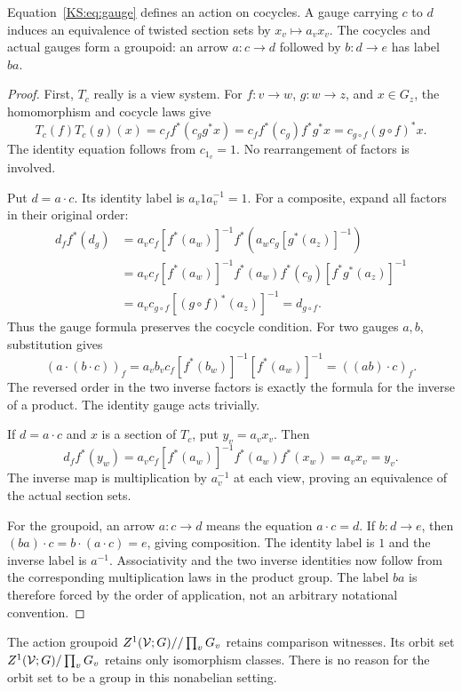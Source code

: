 \begin{KSproposition}\label{KS:KS30}
Equation~\eqref{KS:eq:gauge} defines an action on cocycles. A gauge carrying \(c\) to \(d\) induces an equivalence of twisted section sets by \(x_v\mapsto a_vx_v\). The cocycles and actual gauges form a groupoid: an arrow \(a:c\to d\) followed by \(b:d\to e\) has label \(ba\).
\end{KSproposition}
\begin{proof}
First, $T_c$ really is a view system. For $f:v\to w$, $g:w\to z$, and $x\in G_z$, the homomorphism and cocycle laws give
\[
 T_c(f)T_c(g)(x)=c_ff^*(c_gg^*x)
 =c_ff^*(c_g)f^*g^*x=c_{g\circ f}(g\circ f)^*x.
\]
The identity equation follows from $c_{1_v}=1$. No rearrangement of factors is involved.

Put $d=a\cdot c$. Its identity label is $a_v1a_v^{-1}=1$. For a composite, expand all factors in their original order:
\[
\begin{aligned}
 d_f f^*(d_g)
 &=a_vc_f[f^*(a_w)]^{-1}
   f^*(a_wc_g[g^*(a_z)]^{-1})\\
 &=a_vc_f[f^*(a_w)]^{-1}f^*(a_w)f^*(c_g)
       [f^*g^*(a_z)]^{-1}\\
 &=a_vc_{g\circ f}[(g\circ f)^*(a_z)]^{-1}
 =d_{g\circ f}.
\end{aligned}
\]
Thus the gauge formula preserves the cocycle condition. For two gauges $a,b$, substitution gives
\[
 (a\cdot(b\cdot c))_f
 =a_vb_vc_f[f^*(b_w)]^{-1}[f^*(a_w)]^{-1}
 =((ab)\cdot c)_f.
\]
The reversed order in the two inverse factors is exactly the formula for the inverse of a product. The identity gauge acts trivially.

If $d=a\cdot c$ and $x$ is a section of $T_c$, put $y_v=a_vx_v$. Then
\[
 d_ff^*(y_w)
 =a_vc_f[f^*(a_w)]^{-1}f^*(a_w)f^*(x_w)
 =a_vx_v=y_v.
\]
The inverse map is multiplication by $a_v^{-1}$ at each view, proving an equivalence of the actual section sets.

For the groupoid, an arrow $a:c\to d$ means the equation $a\cdot c=d$. If $b:d\to e$, then $(ba)\cdot c=b\cdot(a\cdot c)=e$, giving composition. The identity label is $1$ and the inverse label is $a^{-1}$. Associativity and the two inverse identities now follow from the corresponding multiplication laws in the product group. The label $ba$ is therefore forced by the order of application, not an arbitrary notational convention.
\end{proof}
The action groupoid \(Z^1(\mathcal V;G)//\prod_vG_v\) retains comparison witnesses. Its orbit set \(Z^1(\mathcal V;G)/\prod_vG_v\) retains only isomorphism classes. There is no reason for the orbit set to be a group in this nonabelian setting.

